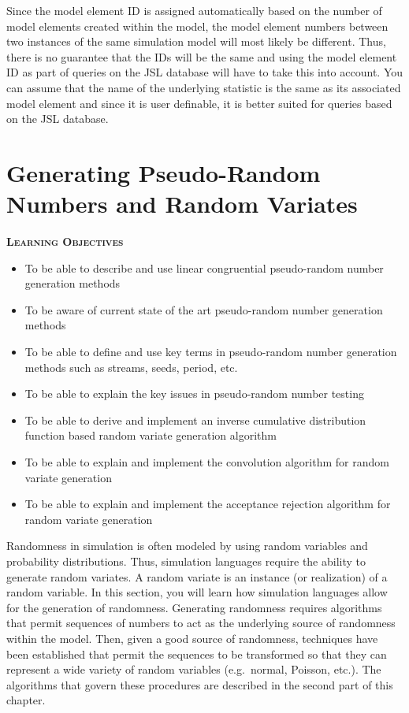\documentclass[
]{book}
\theoremstyle{definition}
\theoremstyle{definition}
\theoremstyle{definition}
\theoremstyle{definition}
\theoremstyle{remark}
\begin{document}
Since the model element ID is assigned automatically based on the number
of model elements created within the model, the model element numbers
between two instances of the same simulation model will most likely be
different. Thus, there is no guarantee that the IDs will be the same and
using the model element ID as part of queries on the JSL database will
have to take this into account. You can assume that the name of the
underlying statistic is the same as its associated model element and
since it is user definable, it is better suited for queries based on the
JSL database.

\cleardoublepage

\hypertarget{app:rnrv}{%
\chapter{Generating Pseudo-Random Numbers and Random Variates}\label{app:rnrv}}

\textbf{\textsc{Learning Objectives}}

\begin{itemize}
\item
  To be able to describe and use linear congruential pseudo-random
  number generation methods
\item
  To be aware of current state of the art pseudo-random number
  generation methods
\item
  To be able to define and use key terms in pseudo-random number
  generation methods such as streams, seeds, period, etc.
\item
  To be able to explain the key issues in pseudo-random number testing
\item
  To be able to derive and implement an inverse cumulative
  distribution function based random variate generation algorithm
\item
  To be able to explain and implement the convolution algorithm for
  random variate generation
\item
  To be able to explain and implement the acceptance rejection
  algorithm for random variate generation
\end{itemize}

Randomness in simulation is often modeled by using
random variables and probability distributions. Thus, simulation
languages require the ability to generate random variates. A random
variate is an instance (or realization) of a random variable. In this
section, you will learn how simulation languages allow for the
generation of randomness. Generating randomness requires algorithms that
permit sequences of numbers to act as the underlying source of
randomness within the model. Then, given a good
source of randomness, techniques have been established that permit the
sequences to be transformed so that they can represent a wide variety of
random variables (e.g.~normal, Poisson, etc.). The algorithms that
govern these procedures are described in the second part of this chapter.
\end{document}
